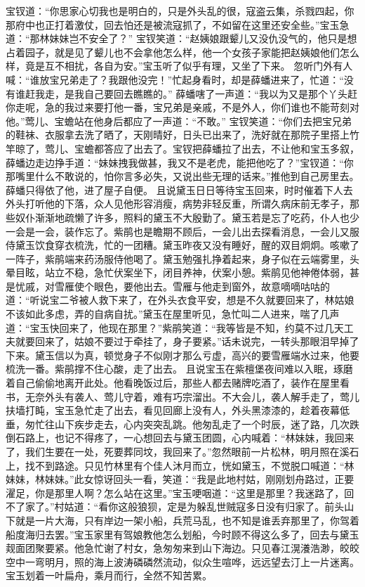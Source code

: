 \documentclass[12pt,oneside]{book}
\begin{document}
宝钗道：“你思家心切我也是明白的，只是外头乱的很，寇盗云集，杀戮四起，你那府中也正打着激仗，回去怕还是被流寇抓了，不如留在这里还安全些。”宝玉急道：“那林妹妹岂不安全了？”
宝钗笑道：“赵姨娘跟颦儿又没仇没气的，他只是想占着园子，就是见了颦儿也不会拿他怎么样，他一个女孩子家能把赵姨娘他们怎么样，竟是互不相扰，各自为安。”宝玉听了似乎有理，又坐了下来。
忽听门外有人喊：“谁放宝兄弟走了？我跟他没完！”忙起身看时，却是薛蟠进来了，忙道：“没有谁赶我走，是我自己要回去瞧瞧的。”
薛蟠嗐了一声道：“我以为又是那个丫头赶你走呢，急的我过来要打他一番，宝兄弟是亲戚，不是外人，你们谁也不能苛刻对他。”莺儿、宝蟾站在他身后都应了一声道：“不敢。”
宝钗笑道：“你们去把宝兄弟的鞋袜、衣服拿去洗了晒了，天刚晴好，日头已出来了，洗好就在那院子里搭上竹竿晾了，莺儿、宝蟾都答应了出去了。宝钗把薛蟠拉了出去，不让他和宝玉多叙，薛蟠边走边挣手道：“妹妹拽我做甚，我又不是老虎，能把他吃了？”宝钗道：“你那嘴里什么不敢说的，怕你言多必失，又说出些无理的话来。”推他到自己房里去。薛蟠只得依了他，进了屋子自便。
且说黛玉日日等待宝玉回来，时时催着下人去外头打听他的下落，众人见他形容消瘦，病势非轻反重，所谓久病床前无孝子，那些奴仆渐渐地疏懒了许多，照料的黛玉不大殷勤了。黛玉若是忘了吃药，仆人也少一会是一会，装作忘了。紫鹃也是瞻期不顾后，一会儿出去探看消息，一会儿又服侍黛玉饮食穿衣梳洗，忙的一团糟。黛玉昨夜又没有睡好，醒的双目炯炯。咳嗽了一阵子，紫鹃端来药汤服侍他喝了。黛玉勉强扎挣着起来，身子似在云端雾里，头晕目眩，站立不稳，急忙伏案坐下，闭目养神，伏案小憩。紫鹃见他神倦体弱，甚是忧戚，对雪雁使个眼色，要他出去。雪雁与他走到窗外，故意嘀嘀咕咕的道：“听说宝二爷被人救下来了，在外头衣食平安，想是不久就要回来了，林姑娘不该如此多虑，弄的自病自扰。”黛玉在屋里听见，急忙叫二人进来，喘了几声道：“宝玉快回来了，他现在那里？”紫鹃笑道：“我等皆是不知，约莫不过几天工夫就要回来了，姑娘不要过于牵挂了，身子要紧。”话未说完，一转头那眼泪早掉了下来。黛玉信以为真，顿觉身子不似刚才那么亏虚，高兴的要雪雁端水过来，他要梳洗一番。紫鹃撑不住心酸，走了出去。
且说宝玉在紫檀堡夜间难以入眠，琢磨着自己偷偷地离开此处。他看晚饭过后，那些人都去赌牌吃酒了，装作在屋里看书，无奈外头有袭人、莺儿守着，难有巧宗溜出。不大会儿，袭人解手走了，莺儿扶墙打盹，宝玉急忙走了出去，看见回廊上没有人，外头黑漆漆的，趁着夜幕低垂，匆忙往山下疾步走去，心内突突乱跳。他匆乱走了一个时辰，迷了路，几次跌倒石路上，也记不得疼了，一心想回去与黛玉团圆，心内喊着：“林妹妹，我回来了，我们生要在一处，死要葬同坟，我回来了。”忽然眼前一片松林，明月照在溪石上，找不到路途。只见竹林里有个佳人沐月而立，恍如黛玉，不觉脱口喊道：“林妹妹，林妹妹。”此女惊讶回头一看，笑道：“我是此地村姑，刚刚划舟路过，正要濯足，你是那里人啊？怎么站在这里。”宝玉哽咽道：“这里是那里？我迷路了，回不了家了。”村姑道：“看你这般狼狈，定是为躲乱世贼寇多日没有归家了。前头山下就是一片大海，只有岸边一架小船，兵荒马乱，也不知是谁丢弃那里了，你驾着船度海归去罢。”宝玉家里有驾娘教他怎么划船，今时顾不得这么多了，回去与黛玉觌面团聚要紧。他急忙谢了村女，急匆匆来到山下海边。只见春江滉瀁浩渺，皎皎空中一弯明月，照的海上波涛磷磷然流动，似众生喧哗，远远望去汀上一片迷离。宝玉划着一叶扁舟，乘月而行，全然不知苦累。
\end{document}
